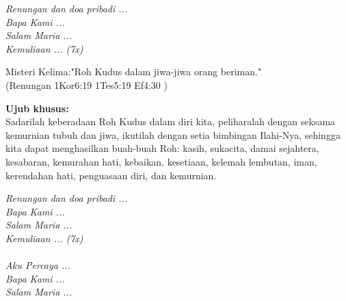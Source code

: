 {\it Renungan dan doa pribadi ...\\
Bapa Kami ...\\
Salam Maria ...\\
Kemuliaan ... (7x)}

Misteri Kelima:"Roh Kudus dalam jiwa-jiwa orang beriman."\\
(Renungan 1Kor6:19 1Tes5:19 Ef4:30 )

{\bf Ujub khusus:}\\
Sadarilah keberadaan Roh Kudus dalam diri kita, peliharalah dengan seksama kemurnian tubuh dan jiwa, ikutilah dengan setia bimbingan Ilahi-Nya, sehingga kita dapat menghasilkan buah-buah Roh: kasih, sukacita, damai sejahtera, kesabaran, kemurahan hati, kebaikan, kesetiaan, kelemah lembutan, iman, kerendahan hati, penguasaan diri, dan kemurnian.

{\it Renungan dan doa pribadi ...\\
Bapa Kami ...\\
Salam Maria ...\\
Kemuliaan ... (7x)\\ \\
Aku Percaya ...\\
Bapa Kami ...\\
Salam Maria ...}    